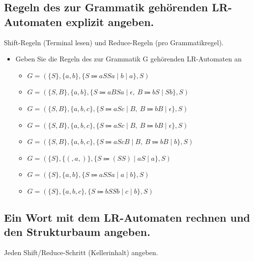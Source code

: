\subsection{Regeln des zur Grammatik gehörenden LR-Automaten explizit angeben.}
Shift-Regeln (Terminal lesen) und Reduce-Regeln (pro Grammatikregel).

\begin{itemize}
    \item Geben Sie die Regeln des zur Grammatik G gehörenden LR-Automaten an
    \begin{itemize}
        \item  $G=(\{S\},\{a,b\},\{S\Coloneqq aSSa\mid b\mid a\},S)$ 
        \item $G=(\{S,B\},\{a,b\},\{S\Coloneqq aBSa\mid\epsilon,\ B\Coloneqq bS\mid Sb\},S)$ 
        \item  $G=(\{S,B\},\{a,b,c\},\{S\Coloneqq aSc\mid B,\ B\Coloneqq bB\mid\epsilon\},S)$ 
        \item $G=(\{S,B\},\{a,b,c\},\{S\Coloneqq aSc\mid B,\ B\Coloneqq bB\mid\epsilon\},S)$ 
        \item  $G=(\{S,B\},\{a,b,c\},\{S\Coloneqq aScB\mid B,\ B\Coloneqq bB\mid b\},S)$ 
        \item  $G=(\{S\},\{(,a,)\},\{S\Coloneqq(SS)\mid aS\mid a\},S)$ 
        \item $G=(\{S\},\{a,b\},\{S\Coloneqq aSSa\mid a\mid b\},S)$ 
        \item $G=(\{S\},\{a,b,c\},\{S\Coloneqq bSSb\mid c\mid b\},S)$ 
    \end{itemize}
\end{itemize}

\subsection{Ein Wort mit dem LR-Automaten rechnen und den Strukturbaum angeben.}
Jeden Shift/Reduce-Schritt (Kellerinhalt) angeben.

